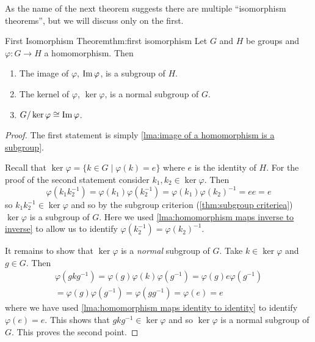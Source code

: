As the name of the next theorem suggests there are multiple \enquote{isomorphism theorems}, but we will discuss only on the first.
\begin{thm}{First Isomorphism Theorem}{thm:first isomorphism}
    Let \(G\) and \(H\) be groups and \(\varphi \colon G \to H\) a homomorphism.
    Then
    \begin{enumerate}
        \item The image of \(\varphi\), \(\operatorname{Im}\varphi\), is a subgroup of \(H\).
        \item The kernel of \(\varphi\), \(\ker\varphi\), is a normal subgroup of \(G\).
        \item \(G/\ker \varphi \cong \operatorname{Im} \varphi\).
    \end{enumerate}
    \begin{proof}
        The first statement is simply \cref{lma:image of a homomorphism is a subgroup}.
        
        Recall that \(\ker\varphi = \{k \in G \mid \varphi(k) = e\}\) where \(e\) is the identity of \(H\).
        For the proof of the second statement consider \(k_1, k_2 \in \ker\varphi\).
        Then
        \begin{equation}
            \varphi(k_1k_2^{-1}) = \varphi(k_1)\varphi(k_2^{-1}) = \varphi(k_1)\varphi(k_2)^{-1} = ee = e
        \end{equation}
        so \(k_1k_2^{-1} \in \ker\varphi\) and so by the subgroup criterion (\cref{thm:subgroup criteriea}) \(\ker\varphi\) is a subgroup of \(G\).
        Here we used \cref{lma:homomorphism maps inverse to inverse} to allow us to identify \(\varphi(k_2^{-1}) = \varphi(k_2)^{-1}\).
        
        It remains to show that \(\ker\varphi\) is a \emph{normal} subgroup of \(G\).
        Take \(k \in \ker\varphi\) and \(g \in G\).
        Then
        \begin{multline}
            \varphi(gkg^{-1}) = \varphi(g)\varphi(k)\varphi(g^{-1}) = \varphi(g)e\varphi(g^{-1})\\
            = \varphi(g)\varphi(g^{-1}) = \varphi(gg^{-1}) = \varphi(e) =e
        \end{multline}
        where we have used \cref{lma:homomorphism maps identity to identity} to identify \(\varphi(e) = e\).
        This shows that \(gkg^{-1} \in \ker\varphi\) and so \(\ker\varphi\) is a normal subgroup of \(G\).
        This proves the second point.
        

\end{proof}
\end{thm}
